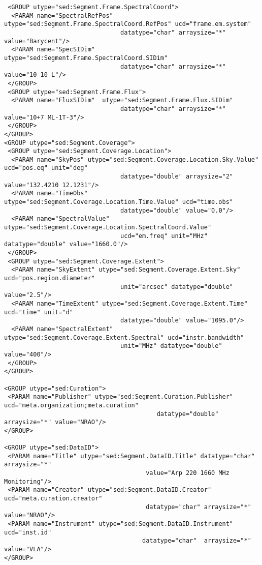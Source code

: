 \documentclass[11pt]{article}
\newenvironment{fmpage}
     {\begin{lrbox}{\fmbox}\begin{minipage}{6.5in}}
     {\end{minipage}\end{lrbox}\colorbox{iblue}{\fbox{\usebox{\fmbox}}}}
\begin{document}
{\begin{flushleft}
\begin{fmpage}
\begin{verbatim}
 <GROUP utype="sed:Segment.Frame.SpectralCoord">
  <PARAM name="SpectralRefPos" utype="sed:Segment.Frame.SpectralCoord.RefPos" ucd="frame.em.system" 
                                datatype="char" arraysize="*" value="Barycent"/>
  <PARAM name="SpecSIDim"  utype="sed:Segment.Frame.SpectralCoord.SIDim" 
                                datatype="char" arraysize="*" value="10-10 L"/>
 </GROUP>
 <GROUP utype="sed:Segment.Frame.Flux">
  <PARAM name="FluxSIDim"  utype="sed:Segment.Frame.Flux.SIDim" 
                                datatype="char" arraysize="*" value="10+7 ML-1T-3"/>
 </GROUP>
</GROUP>
<GROUP utype="sed:Segment.Coverage">
 <GROUP utype="sed:Segment.Coverage.Location">
  <PARAM name="SkyPos" utype="sed:Segment.Coverage.Location.Sky.Value" ucd="pos.eq" unit="deg" 
                                datatype="double" arraysize="2" value="132.4210 12.1231"/>
  <PARAM name="TimeObs" utype="sed:Segment.Coverage.Location.Time.Value" ucd="time.obs" 
                                datatype="double" value="0.0"/>
  <PARAM name="SpectralValue" utype="sed:Segment.Coverage.Location.SpectralCoord.Value" 
                                ucd="em.freq" unit="MHz" datatype="double" value="1660.0"/>
 </GROUP>
 <GROUP utype="sed:Segment.Coverage.Extent">
  <PARAM name="SkyExtent" utype="sed:Segment.Coverage.Extent.Sky" ucd="pos.region.diameter" 
                                unit="arcsec" datatype="double" value="2.5"/>
  <PARAM name="TimeExtent" utype="sed:Segment.Coverage.Extent.Time" ucd="time" unit="d" 
                                datatype="double" value="1095.0"/>
  <PARAM name="SpectralExtent" utype="sed:Segment.Coverage.Extent.Spectral" ucd="instr.bandwidth" 
                                unit="MHz" datatype="double" value="400"/>
 </GROUP>
</GROUP>

<GROUP utype="sed:Curation">
 <PARAM name="Publisher" utype="sed:Segment.Curation.Publisher" ucd="meta.organization;meta.curation"
                                          datatype="double" arraysize="*" value="NRAO"/>
</GROUP>

<GROUP utype="sed:DataID">
 <PARAM name="Title" utype="sed:Segment.DataID.Title" datatype="char" arraysize="*" 
                                       value="Arp 220 1660 MHz Monitoring"/>
 <PARAM name="Creator" utype="sed:Segment.DataID.Creator" ucd="meta.curation.creator" 
                                       datatype="char" arraysize="*" value="NRAO"/>
 <PARAM name="Instrument" utype="sed:Segment.DataID.Instrument" ucd="inst.id"
                                      datatype="char"  arraysize="*" value="VLA"/>
</GROUP>


\end{verbatim}
\end{fmpage}
\end{flushleft}}
\end{document}
